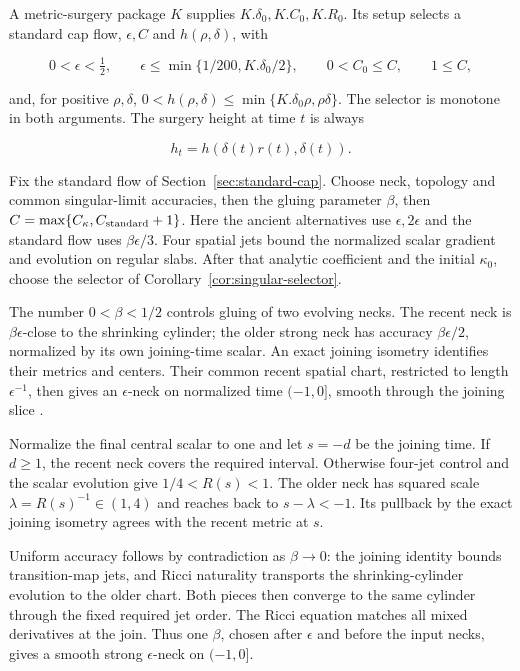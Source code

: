 A metric-surgery package $K$ supplies $K.\delta_0,K.C_0,K.R_0$.
Its setup selects a standard cap flow, $\epsilon,C$ and $h(\rho,\delta)$,
with

\[
  0<\epsilon<\tfrac12,\qquad
  \epsilon\leq\min\{1/200,K.\delta_0/2\},\qquad
  0<C_0\leq C,\qquad 1\leq C,
\]

and, for positive $\rho,\delta$,
$0<h(\rho,\delta)\leq\min\{K.\delta_0\rho,\rho\delta\}$.  The selector is monotone in both
arguments.  The surgery height at time $t$ is always

\begin{equation}
  h_t=h(\delta(t)r(t),\delta(t)).
  \label{eq:global-height}
\end{equation}

Fix the standard flow of Section~\ref{sec:standard-cap}. Choose neck,
topology and common singular-limit accuracies, then the gluing parameter
$\beta$, then $C=\max\{C_\kappa,C_{\rm standard}+1\}$. Here the ancient
alternatives use $\epsilon,2\epsilon$ and the standard flow uses
$\beta\epsilon/3$. Four spatial jets bound the normalized scalar gradient
and evolution on regular slabs. After that analytic coefficient and the
initial $\kappa_0$, choose the selector of Corollary~\ref{cor:singular-selector}.

The number $0<\beta<1/2$ controls gluing of two evolving necks. The
recent neck is $\beta\epsilon$-close to the shrinking cylinder; the
older strong neck has accuracy $\beta\epsilon/2$, normalized by its own
joining-time scalar. An exact joining isometry identifies their metrics
and centers. Their common recent spatial chart, restricted to length
$\epsilon^{-1}$, then gives an $\epsilon$-neck on normalized time
$(-1,0]$, smooth through the joining slice
\cite[Proposition 15.2, pp.~353--354]{MT2007}.

Normalize the final central scalar to one and let $s=-d$ be the joining
time. If $d\geq1$, the recent neck covers the required interval. Otherwise
four-jet control and the scalar evolution give $1/4<R(s)<1$. The older
neck has squared scale $\lambda=R(s)^{-1}\in(1,4)$ and reaches back to
$s-\lambda<-1$. Its pullback by the exact joining isometry agrees with
the recent metric at $s$.

Uniform accuracy follows by contradiction as $\beta\to0$: the joining
identity bounds transition-map jets, and Ricci naturality transports the
shrinking-cylinder evolution to the older chart. Both pieces then converge
to the same cylinder through the fixed required jet order. The Ricci
equation matches all mixed derivatives at the join. Thus one $\beta$,
chosen after $\epsilon$ and before the input necks, gives a smooth strong
$\epsilon$-neck on $(-1,0]$.

